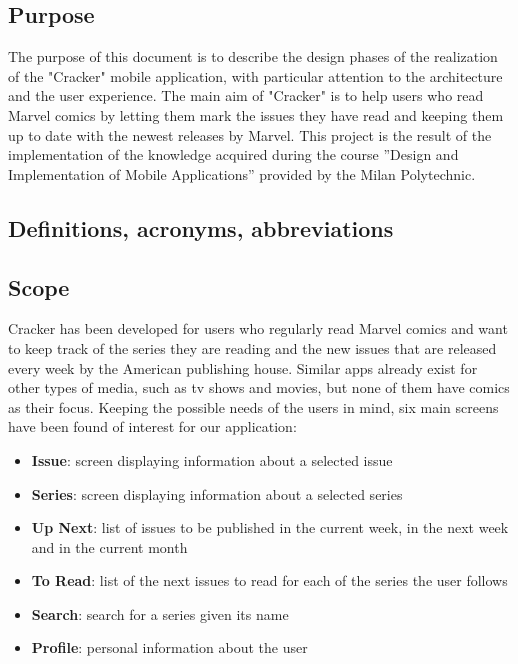 \subsection{Purpose}
The purpose of this document is to describe the design phases of the realization of the "Cracker" mobile application, with particular attention to the architecture and the user experience. \newline
The main aim of "Cracker" is to help users who read Marvel comics by letting them mark the issues they have read and keeping them up to date with the newest releases by Marvel. \newline
This project is the result of the implementation of the knowledge acquired during the course ”Design and Implementation of Mobile Applications” provided by the Milan Polytechnic.


\subsection{Definitions, acronyms, abbreviations}


\subsection{Scope}
Cracker has been developed for users who regularly read Marvel comics and want to keep track of the series they are reading and the new issues that are released every week by the American publishing house. Similar apps already exist for other types of media, such as tv shows and movies, but none of them have comics as their focus. Keeping the possible needs of the users in mind, six main screens have been found of interest for our application:
\begin{itemize}
\item {\textbf{Issue}}: screen displaying information about a selected issue
\item {\textbf{Series}}: screen displaying information about a selected series
\item {\textbf{Up Next}}: list of issues to be published in the current week, in the next week and in the current month
\item {\textbf{To Read}}: list of the next issues to read for each of the series the user follows
\item {\textbf{Search}}: search for a series given its name
\item {\textbf{Profile}}: personal information about the user
\end{itemize}


